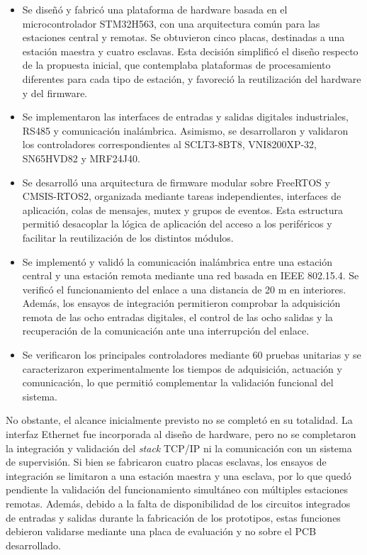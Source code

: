 \begin{itemize}
	\item Se diseñó y fabricó una plataforma de hardware basada en el microcontrolador STM32H563, con una arquitectura común para las estaciones central y remotas. Se obtuvieron cinco placas, destinadas a una estación maestra y cuatro esclavas. Esta decisión simplificó el diseño respecto de la propuesta inicial, que contemplaba plataformas de procesamiento diferentes para cada tipo de estación, y favoreció la reutilización del hardware y del firmware.
	
	\item Se implementaron las interfaces de entradas y salidas digitales industriales, RS485 y comunicación inalámbrica. Asimismo, se desarrollaron y validaron los controladores correspondientes al SCLT3-8BT8, VNI8200XP-32, SN65HVD82 y MRF24J40.
	
	\item Se desarrolló una arquitectura de firmware modular sobre FreeRTOS y CM\-SIS-RTOS2, organizada mediante tareas independientes, interfaces de aplicación, colas de mensajes, mutex y grupos de eventos. Esta estructura permitió desacoplar la lógica de aplicación del acceso a los periféricos y facilitar la reutilización de los distintos módulos.
	
	\item Se implementó y validó la comunicación inalámbrica entre una estación central y una estación remota mediante una red basada en IEEE 802.15.4. Se verificó el funcionamiento del enlace a una distancia de 20 m en interiores. Además, los ensayos de integración permitieron comprobar la adquisición remota de las ocho entradas digitales, el control de las ocho salidas y la recuperación de la comunicación ante una interrupción del enlace.
	
	\item Se verificaron los principales controladores mediante 60 pruebas unitarias y se caracterizaron experimentalmente los tiempos de adquisición, actuación y comunicación, lo que permitió complementar la validación funcional del sistema.
\end{itemize}

No obstante, el alcance inicialmente previsto no se completó en su totalidad. La interfaz Ethernet fue incorporada al diseño de hardware, pero no se completaron la integración y validación del \textit{stack} TCP/IP ni la comunicación con un sistema de supervisión. Si bien se fabricaron cuatro placas esclavas, los ensayos de integración se limitaron a una estación maestra y una esclava, por lo que quedó pendiente la validación del funcionamiento simultáneo con múltiples estaciones remotas. Además, debido a la falta de disponibilidad de los circuitos integrados de entradas y salidas durante la fabricación de los prototipos, estas funciones debieron validarse mediante una placa de evaluación y no sobre el PCB desarrollado.

